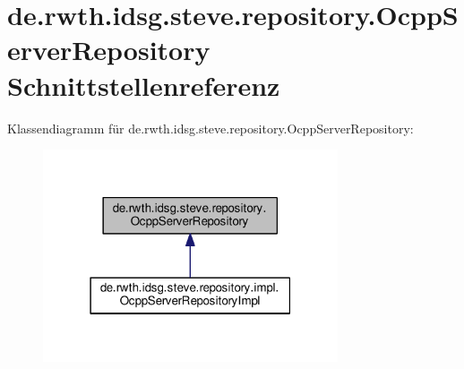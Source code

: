 \hypertarget{interfacede_1_1rwth_1_1idsg_1_1steve_1_1repository_1_1_ocpp_server_repository}{\section{de.\+rwth.\+idsg.\+steve.\+repository.\+Ocpp\+Server\+Repository Schnittstellenreferenz}
\label{interfacede_1_1rwth_1_1idsg_1_1steve_1_1repository_1_1_ocpp_server_repository}
}


Klassendiagramm für de.\+rwth.\+idsg.\+steve.\+repository.\+Ocpp\+Server\+Repository\+:\nopagebreak
\begin{figure}[H]
\begin{center}
\leavevmode
\includegraphics[width=247pt]{interfacede_1_1rwth_1_1idsg_1_1steve_1_1repository_1_1_ocpp_server_repository__inherit__graph}
\end{center}
\end{figure}
